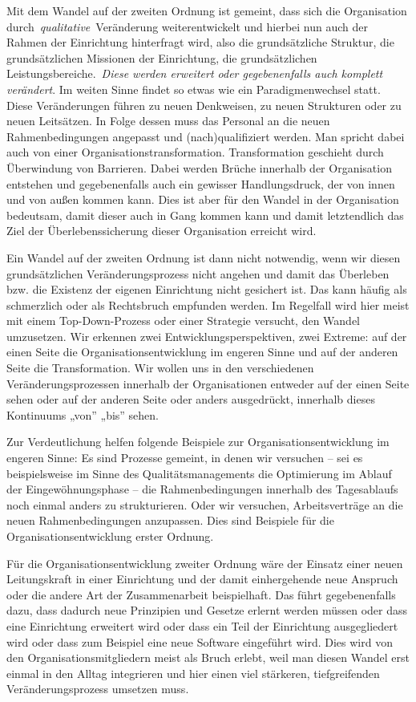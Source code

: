 \documentclass[
  letterpaper,
]{book}
\begin{document}
Mit dem Wandel auf der zweiten Ordnung ist gemeint, dass sich die
Organisation durch~\emph{qualitative}~Veränderung weiterentwickelt und
hierbei nun auch der Rahmen der Einrichtung hinterfragt wird, also die
grundsätzliche Struktur, die grundsätzlichen Missionen der Einrichtung,
die grundsätzlichen Leistungsbereiche.~\emph{Diese werden erweitert oder
gegebenenfalls auch komplett verändert}. Im weiten Sinne findet so etwas
wie ein Paradigmenwechsel statt. Diese Veränderungen führen zu neuen
Denkweisen, zu neuen Strukturen oder zu neuen Leitsätzen. In Folge
dessen muss das Personal an die neuen Rahmenbedingungen angepasst und
(nach)qualifiziert werden. Man spricht dabei auch von einer
Organisationstransformation. Transformation geschieht durch Überwindung
von Barrieren. Dabei werden Brüche innerhalb der Organisation entstehen
und gegebenenfalls auch ein gewisser Handlungsdruck, der von innen und
von außen kommen kann. Dies ist aber für den Wandel in der Organisation
bedeutsam, damit dieser auch in Gang kommen kann und damit letztendlich
das Ziel der Überlebenssicherung dieser Organisation erreicht wird.

Ein Wandel auf der zweiten Ordnung ist dann nicht notwendig, wenn wir
diesen grundsätzlichen Veränderungsprozess nicht angehen und damit das
Überleben bzw. die Existenz der eigenen Einrichtung nicht gesichert ist.
Das kann häufig als schmerzlich oder als Rechtsbruch empfunden werden.
Im Regelfall wird hier meist mit einem Top-Down-Prozess oder einer
Strategie versucht, den Wandel umzusetzen. Wir erkennen zwei
Entwicklungsperspektiven, zwei Extreme: auf der einen Seite die
Organisationsentwicklung im engeren Sinne und auf der anderen Seite die
Transformation. Wir wollen uns in den verschiedenen
Veränderungsprozessen innerhalb der Organisationen entweder auf der
einen Seite sehen oder auf der anderen Seite oder anders ausgedrückt,
innerhalb dieses Kontinuums „von'' „bis'' sehen.

Zur Verdeutlichung helfen folgende Beispiele zur
Organisationsentwicklung im engeren Sinne: Es sind Prozesse gemeint, in
denen wir versuchen -- sei es beispielsweise im Sinne des
Qualitätsmanagements die Optimierung im Ablauf der Eingewöhnungsphase --
die Rahmenbedingungen innerhalb des Tagesablaufs noch einmal anders zu
strukturieren. Oder wir versuchen, Arbeitsverträge an die neuen
Rahmenbedingungen anzupassen. Dies sind Beispiele für die
Organisationsentwicklung erster Ordnung.

Für die Organisationsentwicklung zweiter Ordnung wäre der Einsatz einer
neuen Leitungskraft in einer Einrichtung und der damit einhergehende
neue Anspruch oder die andere Art der Zusammenarbeit beispielhaft. Das
führt gegebenenfalls dazu, dass dadurch neue Prinzipien und Gesetze
erlernt werden müssen oder dass eine Einrichtung erweitert wird oder
dass ein Teil der Einrichtung ausgegliedert wird oder dass zum Beispiel
eine neue Software eingeführt wird. Dies wird von den
Organisationsmitgliedern meist als Bruch erlebt, weil man diesen Wandel
erst einmal in den Alltag integrieren und hier einen viel stärkeren,
tiefgreifenden Veränderungsprozess umsetzen muss.
\end{document}
